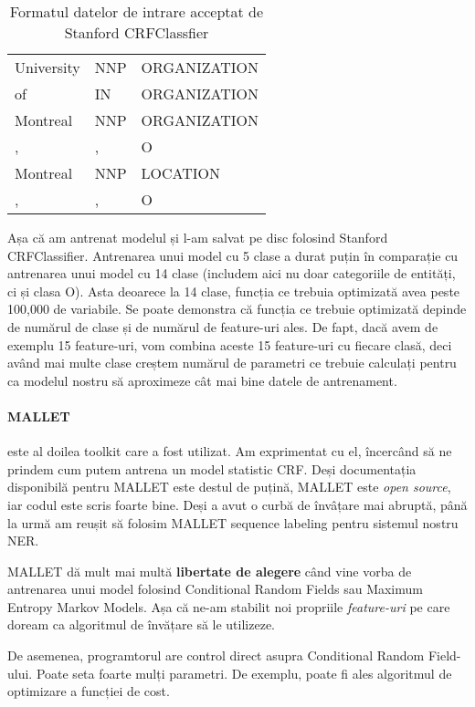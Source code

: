 \begin{center}
\begin{table}[htb]
  \caption{Formatul datelor de intrare acceptat de Stanford CRFClassfier}
  \begin{tabular}{l l l}
   University & NNP & ORGANIZATION \\
   of & IN & ORGANIZATION \\
   Montreal & NNP & ORGANIZATION \\
   ,& , & O \\
   Montreal & NNP & LOCATION\\
   ,& ,& O\\
  \end{tabular}
  \label{table:input-crf}
\end{table}
\end{center}

Așa că am antrenat modelul și l-am salvat pe disc folosind Stanford CRFClassifier. Antrenarea unui model cu 5 clase a durat puțin în comparație cu antrenarea unui model cu 14 clase (includem aici nu doar categoriile de entități, ci și clasa O). Asta deoarece la 14 clase, funcția ce trebuia optimizată avea peste 100,000 de variabile. Se poate demonstra că funcția ce trebuie optimizată depinde de numărul de clase și de numărul de feature-uri ales. De fapt, dacă avem de exemplu 15 feature-uri, vom combina aceste 15 feature-uri  cu fiecare clasă, deci având mai multe clase creștem numărul de parametri ce trebuie calculați pentru ca modelul nostru să aproximeze cât mai bine datele de antrenament.

\paragraph{MALLET} este al doilea toolkit care a fost utilizat. Am exprimentat cu el, încercând să ne prindem cum putem antrena un model statistic CRF. Deși documentația disponibilă pentru MALLET este destul de puțină, MALLET este \textit{open source}, iar codul este scris foarte bine. Deși a avut o curbă de învâțare mai abruptă, până la urmă am reușit să folosim MALLET sequence labeling pentru sistemul nostru NER. 

MALLET dă mult mai multă \textbf{libertate de alegere} când vine vorba de antrenarea unui model folosind Conditional Random Fields sau Maximum Entropy Markov Models. Așa că ne-am stabilit noi propriile \textit{feature-uri} pe care doream ca algoritmul de învățare să le utilizeze.

De asemenea, programtorul are control direct asupra Conditional Random Field-ului. Poate seta foarte mulți parametri. De exemplu, poate fi ales algoritmul de optimizare a funcției de cost.

